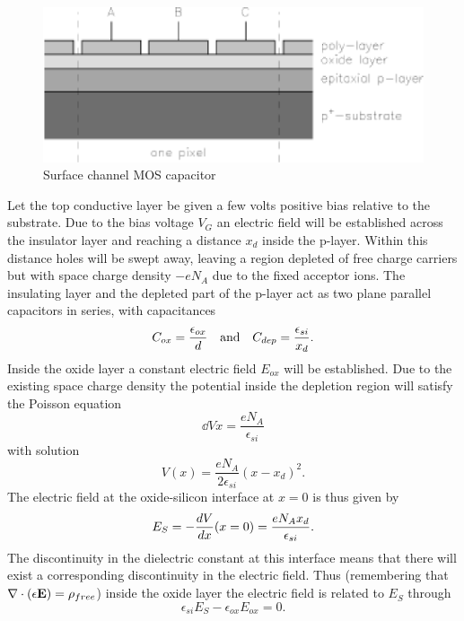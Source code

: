\begin{figure}[h]
  \centering
	\includegraphics{CCD_pMOS.eps}
  \caption{Surface channel MOS capacitor}
  \label{CCD.figpMOS}
\end{figure}

Let the top conductive layer be given a few volts positive bias
relative to the substrate. Due to the bias voltage $V_G$ an electric
field will be established across the insulator layer and reaching a
distance $x_d$ inside the p-layer. Within this distance holes will be
swept away, leaving a region depleted of free charge carriers but with
space charge density $-e N_A$ due to the fixed acceptor ions. The
insulating layer and the depleted part of the p-layer act as two plane
parallel capacitors in series, with capacitances
\begin{equation}
  C_{ox} = \frac{\epsilon_{ox}}{d}
  \quad {\rm and} \quad C_{dep} = \frac{\epsilon_{si}}{x_d}.
\end{equation}
Inside the oxide layer a constant electric field $E_{ox}$ will be
established. Due to the existing space charge density the potential
inside the depletion region will satisfy the Poisson equation
\begin{equation}
  \dd{V}{x} = \frac{e N_A}{\epsilon_{si}}
\end{equation}
with solution
\begin{equation}
  V(x) = \frac{e N_A}{2\epsilon_{si}} (x-x_d)^2.
\end{equation}
The electric field at the oxide-silicon interface at $x=0$ is thus
given by
\begin{equation}
  E_S = -{dV\over dx}(x=0) = \frac{e N_A x_d}{\epsilon_{si}}.
\end{equation}
The discontinuity in the dielectric constant at this interface means
that there will exist a corresponding discontinuity in the electric
field. Thus (remembering that $\nabla\cdot(\epsilon{\bf E})=\rho_{free}$) 
inside the oxide layer the electric field is related to
$E_S$ through
\begin{equation}
  \epsilon_{si} E_S - \epsilon_{ox} E_{ox} = 0.
  \label{CCD.divD}
\end{equation}
